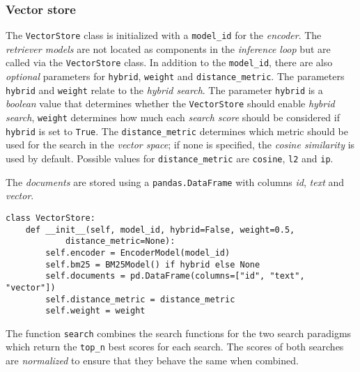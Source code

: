 \documentclass{article}
\begin{document}
\subsubsection{Vector store}
The \colorbox{lightgray!25}{\lstinline{VectorStore}} class is initialized with a \colorbox{lightgray!25}{\lstinline{model_id}} for the \textit{encoder}. The \textit{retriever models} are not located as components in the \textit{inference loop} but are called via the \colorbox{lightgray!25}{\lstinline{VectorStore}} class. In addition to the \colorbox{lightgray!25}{\lstinline{model_id}}, there are also \textit{optional} parameters for \colorbox{lightgray!25}{\lstinline{hybrid}}, \colorbox{lightgray!25}{\lstinline{weight}} and \colorbox{lightgray!25}{\lstinline{distance_metric}}. The parameters \colorbox{lightgray!25}{\lstinline{hybrid}} and \colorbox{lightgray!25}{\lstinline{weight}} relate to the \textit{hybrid search}. The parameter \colorbox{lightgray!25}{\lstinline{hybrid}} is a \textit{boolean} value that determines whether the \colorbox{lightgray!25}{\lstinline{VectorStore}} should enable \textit{hybrid search}, \colorbox{lightgray!25}{\lstinline{weight}} determines how much each \textit{search score} should be considered if \colorbox{lightgray!25}{\lstinline{hybrid}} is set to \colorbox{lightgray!25}{\lstinline{True}}. The \colorbox{lightgray!25}{\lstinline{distance_metric}} determines which metric should be used for the search in the \textit{vector space}; if none is specified, the \textit{cosine similarity} is used by default. Possible values for \colorbox{lightgray!25}{\lstinline{distance_metric}} are \colorbox{lightgray!25}{\lstinline{cosine}}, \colorbox{lightgray!25}{\lstinline{l2}} and \colorbox{lightgray!25}{\lstinline{ip}}.

The \textit{documents} are stored using a \colorbox{lightgray!25}{\lstinline{pandas.DataFrame}} with columns \textit{id}, \textit{text} and \textit{vector}.

\begin{lstlisting}[backgroundcolor = \color{lightgray!25}]
class VectorStore:
    def __init__(self, model_id, hybrid=False, weight=0.5, 
            distance_metric=None):
        self.encoder = EncoderModel(model_id)
        self.bm25 = BM25Model() if hybrid else None
        self.documents = pd.DataFrame(columns=["id", "text", "vector"])
        self.distance_metric = distance_metric
        self.weight = weight
\end{lstlisting}

The function \colorbox{lightgray!25}{\lstinline{search}} combines the search functions for the two search paradigms which return the \colorbox{lightgray!25}{\lstinline{top_n}} best scores for each search. The scores of both searches are \textit{normalized} to ensure that they behave the same when combined. 
\end{document}
